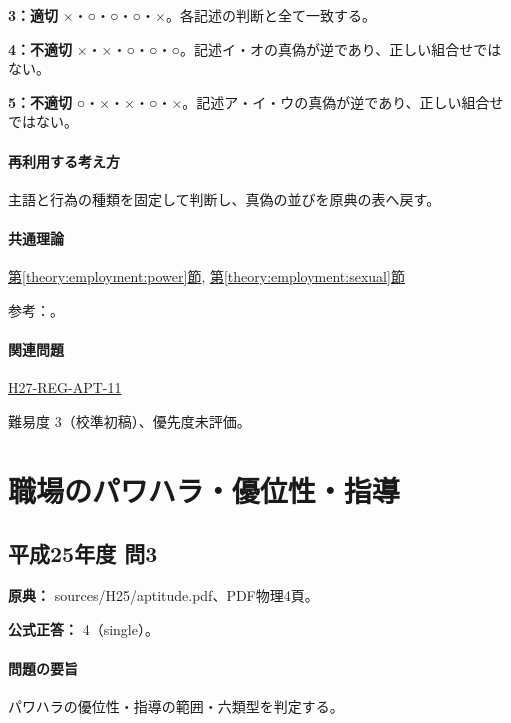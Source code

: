 \noindent\textbf{3：適切} ×・○・○・○・×。各記述の判断と全て一致する。\par

\noindent\textbf{4：不適切} ×・×・○・○・○。記述イ・オの真偽が逆であり、正しい組合せではない。\par

\noindent\textbf{5：不適切} ○・×・×・○・×。記述ア・イ・ウの真偽が逆であり、正しい組合せではない。\par

\paragraph{再利用する考え方} 主語と行為の種類を固定して判断し、真偽の並びを原典の表へ戻す。

\paragraph{共通理論} \hyperref[theory:employment:power]{第\ref*{theory:employment:power}節}, \hyperref[theory:employment:sexual]{第\ref*{theory:employment:sexual}節}

\par 参考：\cite{employment_power2012,employment_power_current,employment_sexual_current,employment_sexual2018}。

\paragraph{関連問題} \hyperref[q:h27-reg-apt-11]{H27-REG-APT-11}

\par 難易度 3（校準初稿）、優先度未評価。

\section{職場のパワハラ・優位性・指導}

\subsection{平成25年度 問3}
\label{q:h25-reg-apt-03}

\noindent\textbf{原典：} sources/H25/aptitude.pdf、PDF物理4頁。

\textbf{公式正答：} 4（single）。

\paragraph{問題の要旨} パワハラの優位性・指導の範囲・六類型を判定する。

